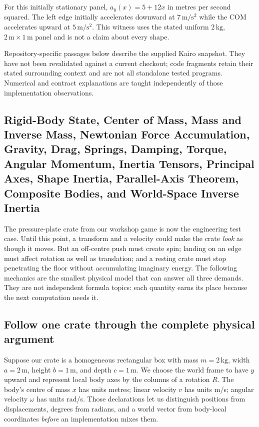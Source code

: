 For this initially stationary panel, \(a_y(x)=5+12x\) in metres per second squared. The left edge initially accelerates downward at \(7\,\mathrm{m/s^2}\) while the COM accelerates upward at \(5\,\mathrm{m/s^2}\). This witness uses the stated uniform \(2\,\mathrm{kg}\), \(2\,\mathrm m\times1\,\mathrm m\) panel and is not a claim about every shape.

Repository-specific passages below describe the supplied Kairo snapshot. They have not been revalidated against a current checkout; code fragments retain their stated surrounding context and are not all standalone tested programs. Numerical and contract explanations are taught independently of those implementation observations.

\subsection{Rigid-Body State, Center of Mass, Mass and Inverse Mass, Newtonian Force Accumulation, Gravity, Drag, Springs, Damping, Torque, Angular Momentum, Inertia Tensors, Principal Axes, Shape Inertia, Parallel-Axis Theorem, Composite Bodies, and World-Space Inverse Inertia}\label{06-engine-ii-ch034-rigid-body-state-center-of-mass-mass-and-inverse-mass-newtonian-force-accumulation-gravity-drag-springs-damping-torque-angular-momentum-inertia-tensors-principal-axes-shape-inertia-parallel-axis-theorem-composite-bodies-and-world-space-inverse-inertia}

The pressure-plate crate from our workshop game is now the engineering test case. Until this point, a transform and a velocity could make the crate \emph{look} as though it moves. But an off-centre push must create spin; landing on an edge must affect rotation as well as translation; and a resting crate must stop penetrating the floor without accumulating imaginary energy. The following mechanics are the smallest physical model that can answer all three demands. They are not independent formula topics: each quantity earns its place because the next computation needs it.

\subsection{Follow one crate through the complete physical argument}\label{06-engine-ii-ch034-follow-one-crate-through-the-complete-physical-argument}

Suppose our crate is a homogeneous rectangular box with mass \(m=2\,\mathrm{kg}\), width \(a=2\,\mathrm m\), height \(b=1\,\mathrm m\), and depth \(c=1\,\mathrm m\). We choose the world frame to have \(y\) upward and represent local body axes by the columns of a rotation \(R\). The body's centre of mass \(x\) has units metres; linear velocity \(v\) has units m/s; angular velocity \(\omega\) has units rad/s. Those declarations let us distinguish positions from displacements, degrees from radians, and a world vector from body-local coordinates \emph{before} an implementation mixes them.

